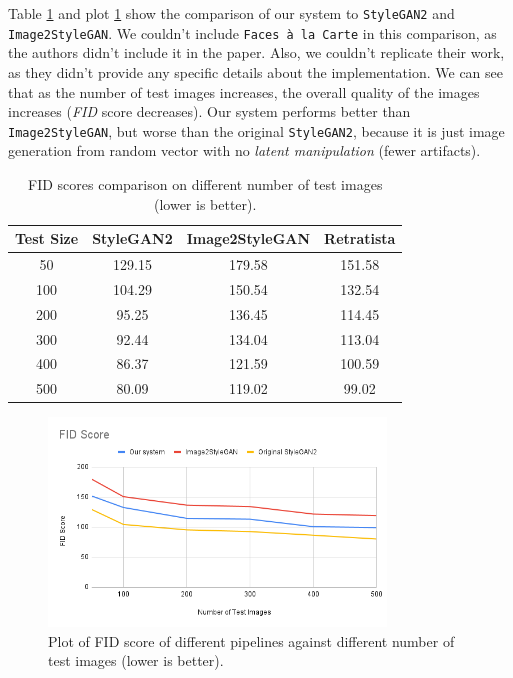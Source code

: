 Table \ref{tab:fid} and plot \ref{fig:fid} show the comparison of our system to \texttt{StyleGAN2} and \texttt{Image2StyleGAN}. We couldn't include \texttt{Faces à la Carte} in this comparison, as the authors didn't include it in the paper. Also, we couldn't replicate their work, as they didn't provide any specific details about the implementation. We can see that as the number of test images increases, the overall quality of the images increases (\emph{FID} score decreases). Our system performs better than \texttt{Image2StyleGAN}, but worse than the original \texttt{StyleGAN2}, because it is just image generation from random vector with no \emph{latent manipulation} (fewer artifacts).

\begin{table}[ht]
\centering
\caption{FID scores comparison on different number of test images (lower is better).}
\begin{tabular}[t]{| c | c | c | c |}
\hline
Test Size & StyleGAN2 & Image2StyleGAN & Retratista \\
\hline
50 & 129.15 & 179.58 & 151.58 \\
\hline
100 & 104.29 & 150.54 & 132.54 \\
\hline
200 & 95.25 & 136.45 & 114.45 \\
\hline
300 & 92.44 & 134.04 & 113.04 \\
\hline
400 & 86.37 & 121.59 & 100.59 \\
\hline
500 & 80.09 & 119.02 & 99.02 \\
\hline
\end{tabular}
\label{tab:fid}
\end{table}

\begin{figure}[H]
    \centering
    \includegraphics[width=0.8\textwidth]{images/fid_score.png}
    \caption{Plot of FID score of different pipelines against different number of test images (lower is better).}
    \label{fig:fid}
\end{figure}

